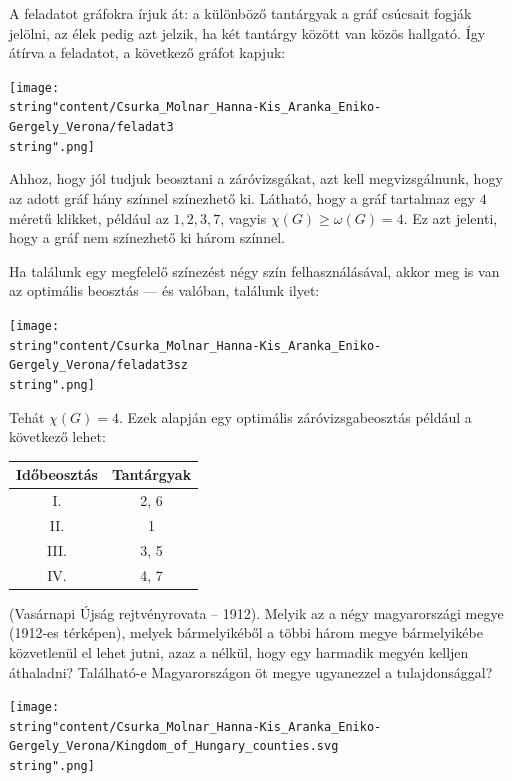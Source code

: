 \begin{solution}
	A feladatot gráfokra írjuk át: a különböző tantárgyak a
	gráf csúcsait fogják jelölni, az élek pedig azt jelzik, ha két tantárgy
	között van közös hallgató. Így átírva a feladatot, a következő gráfot
	kapjuk:
	\begin{center}
		\texttt{[image: \\string"content/Csurka\_Molnar\_Hanna-Kis\_Aranka\_Eniko-Gergely\_Verona/feladat3\\string".png]} 
		\par\end{center}
	Ahhoz, hogy jól tudjuk beosztani a záróvizsgákat, azt kell megvizsgálnunk,
	hogy az adott gráf hány színnel színezhető ki. Látható, hogy a gráf
	tartalmaz egy $4$ méretű klikket, például az $1,2,3,7$, vagyis $\chi(G)\geq\omega(G)=4$.
	Ez azt jelenti, hogy a gráf nem színezhető ki három színnel.
	
	Ha találunk egy megfelelő színezést négy szín felhasználásával, akkor
	meg is van az optimális beosztás --- és valóban, találunk ilyet:
	\begin{center}
		\texttt{[image: \\string"content/Csurka\_Molnar\_Hanna-Kis\_Aranka\_Eniko-Gergely\_Verona/feladat3sz\\string".png]} 
		\par\end{center}
	Tehát $\chi(G)=4$. Ezek alapján egy optimális záróvizsgabeosztás
	például a következő lehet:
	\begin{center}
		\begin{tabular}{|c|c|}
			\hline 
			\textbf{Időbeosztás}  & \textbf{Tantárgyak} \tabularnewline
			\hline 
			I.  & 2, 6 \tabularnewline
			II.  & 1 \tabularnewline
			III.  & 3, 5 \tabularnewline
			IV.  & 4, 7 \tabularnewline
			\hline 
		\end{tabular}
		\par\end{center}
\end{solution}
\begin{problem}
	(Vasárnapi Újság rejtvényrovata -- 1912). Melyik az a négy
	magyarországi megye (1912-es térképen), melyek bármelyikéből a többi
	három megye bármelyikébe közvetlenül el lehet jutni, azaz a nélkül,
	hogy egy harmadik megyén kelljen áthaladni? Található-e Magyarországon
	öt megye ugyanezzel a tulajdonsággal? 
	\begin{center}
		\texttt{[image: \\string"content/Csurka\_Molnar\_Hanna-Kis\_Aranka\_Eniko-Gergely\_Verona/Kingdom\_of\_Hungary\_counties.svg\\string".png]} 
		\par\end{center}
\end{problem}

